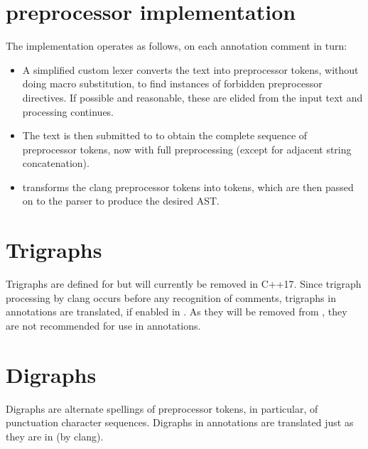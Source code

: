 \section{\fclang preprocessor implementation}
The \fclang implementation operates as follows, on each \acslpp annotation comment in turn:
\begin{itemize}
\item A simplified custom lexer converts the text into preprocessor tokens, without doing macro substitution, to find instances of forbidden preprocessor directives. If possible and reasonable, these are elided from the input text and processing continues.
\item The text is then submitted to \cl to obtain the complete sequence of preprocessor tokens, now with full preprocessing (except for adjacent string concatenation).
\item \fcl transforms the clang preprocessor tokens into \acslpp tokens, which are then passed on to the \acslpp parser to produce the desired AST.
\end{itemize}

\section{Trigraphs}

Trigraphs are defined for \cpp but will currently be removed in C++17. Since trigraph processing by clang occurs before any recognition of comments, trigraphs in \acslpp annotations are translated, if enabled in \clang. As they will be removed from \cpp, they are not recommended for use in \acslpp annotations.

\section{Digraphs}
Digraphs are alternate spellings of preprocessor tokens, in particular, of
punctuation character sequences. Digraphs in \acslpp annotations are translated just as they are in \cpp (by clang).

